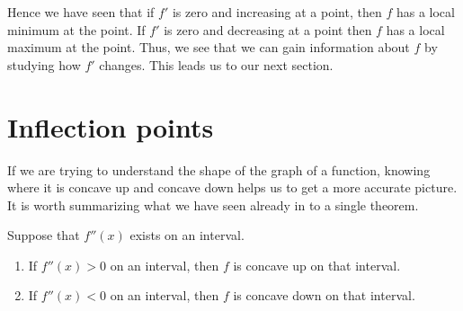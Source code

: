 \documentclass{ximera}
\begin{document}
\begin{example}
\begin{explanation}
\begin{image}
\end{image}
\end{explanation}
\end{example}


Hence we have seen that if $f'$ is zero and increasing at a point,
then $f$ has a local minimum at the point. If $f'$ is zero and
decreasing at a point then $f$ has a local maximum at the
point. Thus, we see that we can gain information about $f$ by
studying how $f'$ changes. This leads us to our next section.








\section{Inflection points}


If we are trying to understand the shape of the graph of a function,
knowing where it is concave up and concave down helps us to get a more
accurate picture. It is worth summarizing what we have seen already in
to a single theorem.

\begin{theorem}
Suppose that $f''(x)$ exists on an interval.
\begin{enumerate}
\item If $f''(x)>0$ on an interval, then $f$ is concave up on that interval.
\item If $f''(x)<0$ on an interval, then $f$ is concave down on that interval.
\end{enumerate}
\end{theorem}
\end{document}
